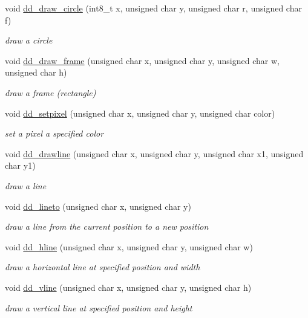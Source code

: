 \begin{DoxyCompactItemize}
void \hyperlink{group__display_ga583b488e0a33d91c7422b17bcd3ca75d}{dd\-\_\-draw\-\_\-circle} (int8\-\_\-t x, unsigned char y, unsigned char r, unsigned char f)
\begin{DoxyCompactList}\small\item\em draw a circle \end{DoxyCompactList}\item 
void \hyperlink{group__display_ga62392dbfb72a9071166abdffb6835c18}{dd\-\_\-draw\-\_\-frame} (unsigned char x, unsigned char y, unsigned char w, unsigned char h)
\begin{DoxyCompactList}\small\item\em draw a frame (rectangle) \end{DoxyCompactList}\item 
void \hyperlink{group__display_ga30dd8928bfac3cfd234afe5983b13436}{dd\-\_\-setpixel} (unsigned char x, unsigned char y, unsigned char color)
\begin{DoxyCompactList}\small\item\em set a pixel a specified color \end{DoxyCompactList}\item 
void \hyperlink{group__display_ga9fe0d2c43ae2407191b9a522bb580686}{dd\-\_\-drawline} (unsigned char x, unsigned char y, unsigned char x1, unsigned char y1)
\begin{DoxyCompactList}\small\item\em draw a line \end{DoxyCompactList}\item 
void \hyperlink{group__display_gae7182b6fde52b4264b22cc5c4cdbae0b}{dd\-\_\-lineto} (unsigned char x, unsigned char y)
\begin{DoxyCompactList}\small\item\em draw a line from the current position to a new position \end{DoxyCompactList}\item 
void \hyperlink{group__display_gaa6fe3be96609537f1dde783a815a51f6}{dd\-\_\-hline} (unsigned char x, unsigned char y, unsigned char w)
\begin{DoxyCompactList}\small\item\em draw a horizontal line at specified position and width \end{DoxyCompactList}\item 
void \hyperlink{group__display_gad27d393cb4e4339dcd0671908e22b65c}{dd\-\_\-vline} (unsigned char x, unsigned char y, unsigned char h)
\begin{DoxyCompactList}\small\item\em draw a vertical line at specified position and height \end{DoxyCompactList}\item 

\end{DoxyCompactItemize}
